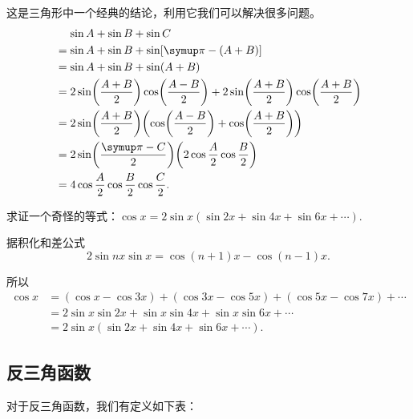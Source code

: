 \begin{prove}
    这是三角形中一个经典的结论，利用它我们可以解决很多问题。
    \[
        \begin{aligned}
             & \mathrel{\phantom{=}}\sin A+\sin B+\sin C                                                                                        \\
             & =\sin A+\sin B+\sin [\symup\pi -(A+B)]                                                                                           \\
             & =\sin A+\sin B+\sin(A+B)                                                                                                         \\
             & =2\sin\left( \frac{A+B}{2}\right)\cos\left( \frac{A-B}{2}\right)+2\sin\left( \frac{A+B}{2}\right)\cos\left( \frac{A+B}{2}\right) \\
             & =2\sin\left( \frac{A+B}{2}\right)\left (\cos\left( \frac{A-B}{2}\right)+\cos\left( \frac{A+B}{2}\right)\right )                  \\
             & =2\sin\left( \frac{\symup\pi -C}{2} \right) \left (2\cos\frac{A}{2}\cos\frac{B}{2}\right )                                       \\
             & =4\cos \frac{A}{2}\cos \frac{B}{2}\cos \frac{C}{2}.
        \end{aligned}
    \]
\end{prove}

\begin{example}
    求证一个奇怪的等式：$\cos x=2\sin x(\sin 2x+\sin 4x+\sin 6x+\cdots)$.
\end{example}

\begin{prove}
    据积化和差公式
    \[
        2\sin nx \sin x = \cos(n+1)x-\cos(n-1)x.
    \]

    所以
    \[
        \begin{aligned}
            \cos x & =(\cos x-\cos 3x)+(\cos 3x-\cos 5x)+(\cos 5x-\cos 7x)+\cdots \\
                   & =2\sin x \sin 2x +\sin x\sin 4x+\sin x\sin 6x+\cdots         \\
                   & =2\sin x(\sin 2x+\sin 4x+\sin 6x+\cdots).
        \end{aligned}
    \]
\end{prove}


\subsection{反三角函数}
对于反三角函数，我们有定义如下表：

